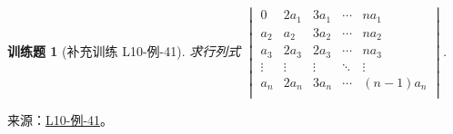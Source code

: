 \documentclass[UTF8,12pt,a4paper,fontset=fandol]{ctexart}
\newtheorem{exercise}{训练题}[section]
\begin{document}
\begin{exercise}[补充训练 L10-例-41]\label{prob:L10-例-41}
求行列式 $\begin{vmatrix}
                    0      & 2a_1   & 3a_1   & \cdots & na_1     \\
                    a_2    & a_2    & 3a_2   & \cdots & na_2     \\
                    a_3    & 2a_3   & 2a_3   & \cdots & na_3     \\
                    \vdots & \vdots & \vdots & \ddots & \vdots   \\
                    a_n    & 2a_n   & 3a_n   & \cdots & (n-1)a_n \\
                \end{vmatrix}$.
\end{exercise}
\noindent 来源：\href{https://github.com/yhwu-is/Linear-Algebra-Left-Undone/blob/new/%E8%AE%B2%E4%B9%89/%E4%B8%93%E9%A2%98/10%20%E8%A1%8C%E5%88%97%E5%BC%8F.tex}{L10-例-41}。
\end{document}
